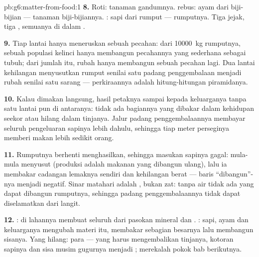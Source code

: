 \begin{solution}{pb:g6:matter-from-food:1}
\textbf{8.} Roti:  tanaman gandumnya.  rebus: ayam dari
biji-bijian ---  tanaman biji-bijiannya. : sapi dari rumput
---  rumputnya. Tiga jejak, tiga , semuanya di dalam .

\textbf{9.} Tiap lantai hanya meneruskan sebuah pecahan: dari
\qty{10000}{kg} rumputnya, sebuah populasi kelinci hanya membangun
pecahannya yang sederhana sebagai tubuh; dari jumlah itu, rubah hanya
membangun sebuah pecahan lagi. Dua lantai kehilangan menyusutkan
rumput senilai satu padang penggembalaan menjadi rubah senilai satu
sarang --- perkiraannya adalah hitung-hitungan piramidanya.

\textbf{10.} Kalau dimakan langsung, hasil petaknya sampai kepada
keluarganya tanpa satu lantai  pun di antaranya: tidak ada
bagiannya yang dibakar dalam kehidupan seekor  atau hilang dalam
tinjanya. Jalur padang penggembalaannya membayar seluruh pengeluaran
sapinya lebih dahulu, sehingga tiap meter perseginya memberi makan
lebih sedikit orang.

\textbf{11.} Rumputnya berhenti menghasilkan, sehingga masukan sapinya
gagal: mula-mula  menyusut (produksi adalah makanan yang
dibangun ulang), lalu ia membakar cadangan lemaknya sendiri dan
kehilangan berat --- baris ``dibangun''-nya menjadi negatif. Sinar
matahari adalah , bukan zat: tanpa air tidak ada yang dapat
dibangun rumputnya, sehingga padang penggembalaannya tidak dapat
diselamatkan dari langit.

\textbf{12.} :  di lahannya membuat seluruh  dari pasokan mineral dan . : sapi, ayam dan
keluarganya mengubah materi itu, membakar sebagian besarnya lalu
membangun sisanya. Yang hilang: para  --- yang harus
mengembalikan tinjanya, kotoran sapinya dan sisa musim gugurnya
menjadi ; merekalah pokok bab berikutnya.
\end{solution}

